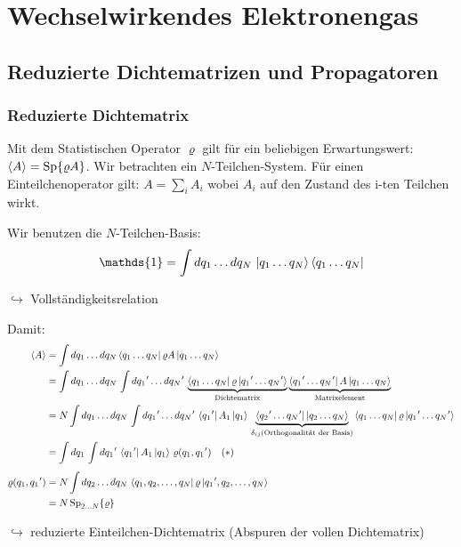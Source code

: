 \section{Wechselwirkendes Elektronengas}

\subsection{Reduzierte Dichtematrizen und Propagatoren}

\subsubsection*{Reduzierte Dichtematrix}
Mit dem Statistischen Operator $\varrho$ gilt für ein beliebigen Erwartungswert:$\left\langle A\right\rangle = \mathrm{Sp}\{\varrho A\}$. Wir betrachten ein \(N\)-Teilchen-System.
Für einen Einteilchenoperator gilt: $A = \sum\limits_i A_i$ wobei $A_i$ auf den Zustand des i-ten Teilchen wirkt.

Wir benutzen die \(N\)-Teilchen-Basis:
\begin{equation}
  \mathds{1} = \int dq_1 \dots dq_N \, \ket{q_1 \dots q_N}\bra{q_1 \dots q_N}
\end{equation}
\begin{center}
  $\hookrightarrow$ Vollständigkeitsrelation
\end{center}
Damit:
\begin{align}
  \left\langle A\right\rangle
   & = \int dq_1 \dots dq_N \left\langle q_1 \dots q_N\right| \varrho A \left|q_1 \dots q_N\right\rangle \notag                              \\
   & = \int dq_1 \dots dq_N \,\int dq_1\mkern1mu' \dots dq_N\mkern1mu' \,
  \underbrace{\left\langle q_1 \dots q_N\right| \varrho \left|q_1\mkern1mu' \dots q_N\mkern1mu'\right\rangle}_{\text{Dichtematrix}}
  \underbrace{\left\langle q_1\mkern1mu' \dots q_N\mkern1mu'\right| A \left|q_1 \dots q_N\right\rangle}_{\text{Matrixelement}} \notag        \\
   & = N \int dq_1 \dots dq_N \,\int dq_1\mkern1mu' \dots dq_N\mkern1mu'\,
  \left\langle q_1\mkern1mu'\right|A_1\left|q_1\right\rangle \,
  \underbrace{\left\langle q_2\mkern1mu' \dots q_N\mkern1mu'\right| \left|q_2 \dots q_N\right\rangle}_{\delta_{ij} \text{(Orthogonalität der Basis)}}
  \left\langle q_1 \dots q_N\right| \varrho \left|q_1\mkern1mu' \dots q_N\mkern1mu'\right\rangle \notag                                      \\
   & = \int dq_1 \,\int dq_1\mkern1mu' \, \left\langle q_1\mkern1mu'\right|A_1\left|q_1\right\rangle \, \varrho(q_1,q_1\mkern1mu') \quad (*)
  \\[0.4em]
  \varrho(q_1,q_1\mkern1mu')
   & = N \int dq_2 \dots dq_N \, \left\langle q_1,q_2,\dots,q_N\right| \varrho \left|q_1\mkern1mu',q_2,\dots,q_N\right\rangle \notag         \\
   & = N\,\mathrm{Sp}_{2\dots N}\{\varrho\}
\end{align}
\begin{center}
  $\hookrightarrow$ reduzierte Einteilchen-Dichtematrix (Abspuren der vollen Dichtematrix)
\end{center}

